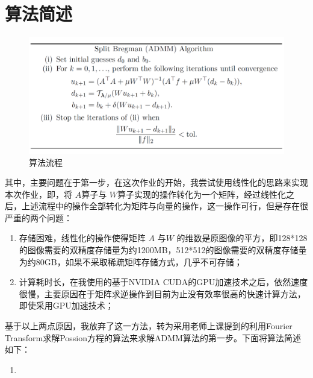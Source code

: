 \documentclass[a4paper, UTF8]{ctexrep}
\begin{document}
	\section{算法简述}
		\begin{figure}
			\includegraphics{fig1.png}
			\caption{算法流程}
			\label{}
		\end{figure}
		其中，主要问题在于第一步，在这次作业的开始，我尝试使用线性化的思路来实现本次作业，即，将 $A$算子与 $W$算子实现的操作转化为一个矩阵，经过线性化之后，上述流程中的操作全部转化为矩阵与向量的操作，这一操作可行，但是存在很严重的两个问题：
		\begin{enumerate}
			\item 存储困难，线性化的操作使得矩阵 $A$ 与$W$ 的维数是原图像的平方，即128*128的图像需要的双精度存储量为约1200MB，512*512的图像需要的双精度存储量为约80GB，如果不采取稀疏矩阵存储方式，几乎不可存储；
			\item 计算耗时长，在我使用的基于NVIDIA CUDA的GPU加速技术之后，依然速度很慢，主要原因在于矩阵求逆操作到目前为止没有效率很高的快速计算方法，即使采用GPU加速技术；
		\end{enumerate}
		基于以上两点原因，我放弃了这一方法，转为采用老师上课提到的利用Fourier Transform求解Possion方程的算法来求解ADMM算法的第一步。下面将算法简述如下：
		\begin{enumerate}
			\item 
		\end{enumerate}
\end{document}
